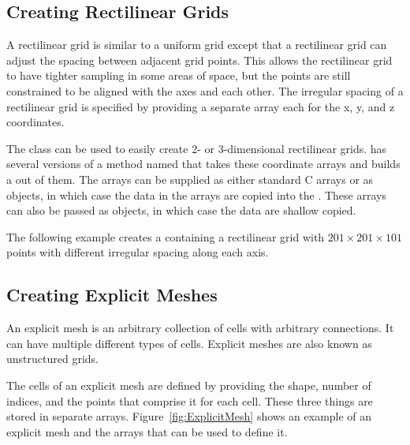 
\subsection{Creating Rectilinear Grids}


A rectilinear grid is similar to a uniform grid except that a rectilinear
grid can adjust the spacing between adjacent grid points. This allows the
rectilinear grid to have tighter sampling in some areas of space, but the
points are still constrained to be aligned with the axes and each other. The
irregular spacing of a rectilinear grid is specified by providing a
separate array each for the x, y, and z coordinates.

The  class can be used to easily create
2- or 3-dimensional rectilinear grids.
 has several versions of a method
named  that takes these coordinate arrays and builds a
 out of them. The arrays can be supplied as either
standard C arrays or as  objects, in which case the
data in the arrays are copied into the . These
arrays can also be passed as  objects, in which
case the data are shallow copied.

The following example creates a  containing a rectilinear
grid with $201 \times 201 \times 101$ points with different irregular
spacing along each axis.


\subsection{Creating Explicit Meshes}


An explicit mesh is an arbitrary collection of cells with arbitrary
connections. It can have multiple different types of cells. Explicit meshes
are also known as unstructured grids.

The cells of an explicit mesh are defined by providing the shape, number of
indices, and the points that comprise it for each cell. These three things
are stored in separate arrays. Figure~\ref{fig:ExplicitMesh} shows an
example of an explicit mesh and the arrays that can be used to define it.

